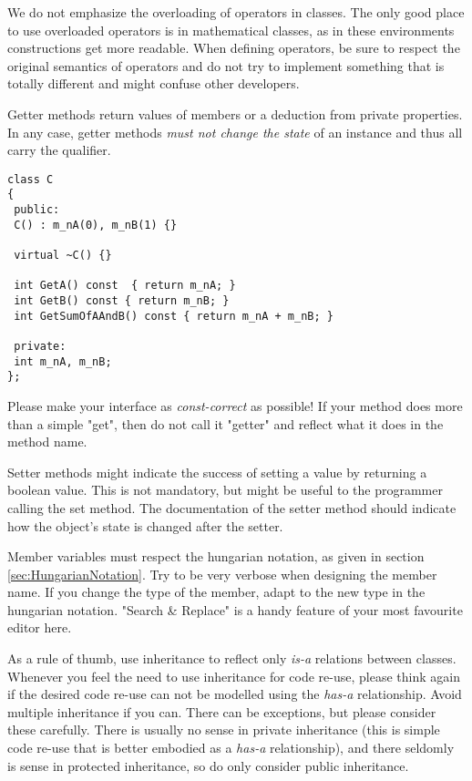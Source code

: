 We do not emphasize the overloading of operators in classes.
The only good place to use overloaded operators is in mathematical classes, as in these environments constructions get more readable.
When defining operators, be sure to respect the original semantics of operators and do not try to implement something that is totally different and might confuse other developers.

Getter methods return values of members or a deduction from private properties.
In any case, getter methods \emph{must not change the state} of an instance and thus all carry the  qualifier.
\begin{verbatim}
class C
{
 public:
 C() : m_nA(0), m_nB(1) {}
 
 virtual ~C() {}
 
 int GetA() const  { return m_nA; }
 int GetB() const { return m_nB; }
 int GetSumOfAAndB() const { return m_nA + m_nB; }
 
 private:
 int m_nA, m_nB;
}; 
\end{verbatim}
Please make your interface as \emph{const-correct} as possible!
If your method does more than a simple "get", then do not call it "getter" and reflect what it does in the method name.

Setter methods might indicate the success of setting a value by returning a boolean value.
This is not mandatory, but might be useful to the programmer calling the set method.
The documentation of the setter method should indicate how the object's state is changed after the setter.


Member variables must respect the hungarian notation, as given in section \ref{sec:HungarianNotation}.
Try to be very verbose when designing the member name. 
If you change the type of the member, adapt to the new type in the hungarian notation.
"Search \& Replace" is a handy feature of your most favourite editor here.


As a rule of thumb, use inheritance to reflect only \emph{is-a} relations between classes.
Whenever you feel the need to use inheritance for code re-use, please think again if the desired code re-use can not be modelled using the \emph{has-a} relationship.
Avoid multiple inheritance if you can.
There can be exceptions, but please consider these carefully.
There is usually no sense in private inheritance (this is simple code re-use that is better embodied as a \emph{has-a} relationship), and there seldomly is sense in protected inheritance, so do only consider public inheritance.

